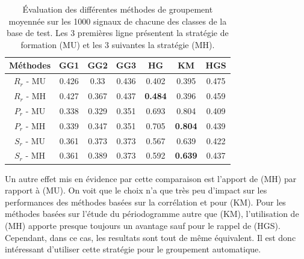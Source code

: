 \documentclass{gretsi}
\begin{document}
\begin{table}[h]
\begin{tabular}{|c|c|c|c|c|c|c|}
	\hline
	Méthodes & GG1 & GG2 & GG3 & HG & KM & HGS\\\hline 
	$R_r$ - MU & 0.426 & 0.33 & 0.436 & 0.402 & 0.395 & 0.475\\\hline
$R_r$ - MH & 0.427 & 0.367 & 0.437 & \textbf{0.484} & 0.396 & 0.459\\\hline
$P_r$ - MU & 0.338 & 0.329 & 0.351 & 0.693 & 0.804 & 0.409\\\hline
$P_r$ - MH & 0.339 & 0.347 & 0.351 & 0.705 & \textbf{0.804} & 0.439\\\hline
$S_r$ - MU & 0.361 & 0.373 & 0.373 & 0.567 & 0.639 & 0.422\\\hline
$S_r$ - MH & 0.361 & 0.389 & 0.373 & 0.592 & \textbf{0.639} & 0.437\\\hline

\end{tabular}
\caption{\'Evaluation des différentes méthodes de groupement moyennée sur les 1000 signaux de chacune des classes de la base de test. Les 3 premières ligne présentent la stratégie de formation (MU) et les 3 suivantes la stratégie (MH).}
\label{tab:res}
\end{table}

Un autre effet mis en évidence par cette comparaison est l'apport de (MH) par rapport à (MU).
On voit que le choix n'a que très peu d'impact sur les performances des méthodes basées sur la corrélation et pour (KM).
Pour les méthodes basées sur l'étude du périodogramme autre que (KM), l'utilisation de (MH) apporte presque toujours un avantage sauf pour le rappel de (HGS). 
Cependant, dans ce cas, les resultats sont tout de même équivalent.
Il est donc intéressant d'utiliser cette stratégie pour le groupement automatique.
\end{document}
